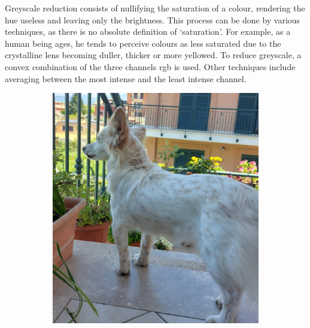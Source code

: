 \begin{toReview}
\noindent Greyscale reduction consists of nullifying the saturation of a colour, rendering the hue useless and leaving only the brightness. This process can be done by various techniques, as there is no absolute definition of ‘saturation’. For example, as a human being ages, he tends to perceive colours as less saturated due to the crystalline lens becoming duller, thicker or more yellowed. To reduce greyscale, a convex combination of the three channels \gls{rgb} is used. Other techniques include averaging between the most intense and the least intense channel.
\end{toReview}
\begin{figure}[h]
    \centering
    \begin{subfigure}[t]{0.4\linewidth}
        \includegraphics[width=\linewidth]{Figures/example.jpeg}
    \end{subfigure}
    \hspace{2cm}
    \begin{subfigure}[t]{0.4\linewidth}

\end{subfigure}
\end{figure}
